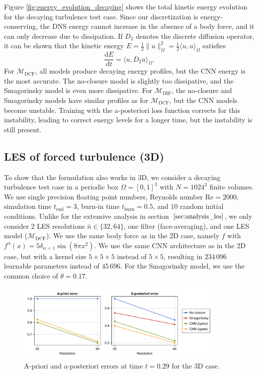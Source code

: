 \documentclass[preprint]{elsarticle}
\newcommand{\R}[1]{}
\newcommand{\revboth}[1]{#1}
\begin{document}
Figure \ref{fig:energy_evolution_decaying} shows the total kinetic energy
evolution for the decaying turbulence test case. Since our discretization is
energy-conserving, the DNS energy cannot increase in the absence of a body
force, and it can only decrease due to dissipation. If $D_2$ denotes the
discrete diffusion operator, it can be shown that the kinetic energy
$E = \frac{1}{2} \| u \|_\Omega^2 = \frac{1}{2} \langle u, u \rangle_\Omega$
satisfies
\begin{equation}
    \frac{\mathrm{d} E}{\mathrm{d} t} = \langle u, D_2 u \rangle_\Omega.
\end{equation}
For $\mathcal{M}_\text{DCF}$, all models produce decaying energy profiles, but
the CNN energy is the most accurate. The no-closure model is slightly too
dissipative, and the Smagorinsky model is even more dissipative.
For $\mathcal{M}_\text{DIF}$, the no-closure and Smagorinsky models have similar
profiles as for $\mathcal{M}_\text{DCF}$, but the CNN models become unstable.
Training with the a-posteriori loss function corrects for this instability,
leading to correct energy levels for a longer time, but the instability is still
present.

\subsection{LES of forced turbulence (3D)} \label{sec:les3D}

\R{les3D}
To show that the formulation also works in 3D,
we consider a decaying turbulence test case in
a periodic box $\Omega = [0, 1]^3$ with $N = 1024^3$ finite volumes.
We use single precision floating point numbers,
Reynolds number $\mathrm{Re} = 2000$,
simulation time $t_\text{end} = 3$,
burn-in time $t_\text{burn} = 0.5$, and
$10$ random initial conditions.
Unlike for the extensive analysis in section~$\ref{sec:analysis_les}$,
we only consider $2$ LES resolutions $\bar{n} \in \{ 32, 64 \}$,
one filter (face-averaging),
and one LES model ($\mathcal{M}_\text{DCF}$).
We use the same body force as in the 2D case, namely $f$ with $f^\alpha(x) = 5
\delta_{\alpha = 1} \sin(8 \pi x^2)$.
We use the same CNN architecture as in the 2D case, but with a kernel size
$5 \times 5 \times 5$ instead of $5 \times 5$,
resulting in $234\,096$ learnable parameters instead of $45\,696$.
For the Smagorinsky model, we use the common choice of $\theta = 0.17$.

\begin{figure}
    \centering
    \includegraphics[width=0.9\textwidth]{figures_kolmogorov3D_epriorandpost.pdf}
    \caption{\revboth{
        A-priori and a-posteriori errors at time $t = 0.29$ for the 3D case.
    }}
    \label{fig:errors3D}
\end{figure}
\end{document}
